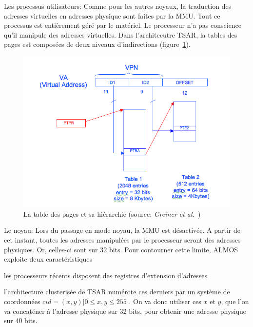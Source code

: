       \begin{paragraph}{Les processus utilisateurs:}
        Comme pour les autres noyaux, la traduction des adresses virtuelles en
        adresses physique sont faites par la MMU. Tout ce processus est
        entièrement géré par le matériel. Le processeur n'a pas conscience qu'il
        manipule des adresses virtuelles. Dans l'architecutre TSAR, la tables
        des pages est composées de deux niveaux d'indirections
        (figure~\ref{fig:page-table}).
        
        \begin{figure}
          \centering
          \includegraphics[scale=0.35]{include/img/pages_table_levels.png}
          \caption{La table des pages et sa hiérarchie (source: \textit{Greiner
              et al.}~\cite{tsar2008web})}
          \label{fig:page-table}
        \end{figure}
        
      \end{paragraph}
      \begin{paragraph}{Le noyau:}
        Lors du passage en mode noyau, la MMU est désactivée. A partir de cet
        instant, toutes les adresses manipulées par le processeur seront des
        adresses physiques. Or, celles-ci sont sur 32 bits. Pour contourner
        cette limite, ALMOS exploite deux caractéristiques \benumline \item les
        processeurs récents disposent des registres d'extension d'adresses \item
        l'architecture clusterisée de TSAR numérote ces derniers par un système
        de coordonnées $cid = (x, y) | 0 \leq x,y \leq 255$ \eenumline. On va
        donc utiliser ces $x$ et $y$, que l'on va concaténer à l'adresse
        physique sur 32 bits, pour obtenir une adresse physique sur 40 bits.
      \end{paragraph}

